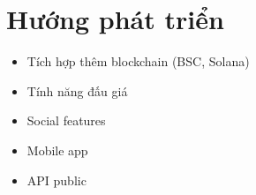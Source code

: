 \documentclass[a4paper,12pt]{report}
\begin{document}
\section{Hướng phát triển}
\begin{itemize}
    \item Tích hợp thêm blockchain (BSC, Solana)
    \item Tính năng đấu giá
    \item Social features
    \item Mobile app
    \item API public
\end{itemize}
\end{document}

